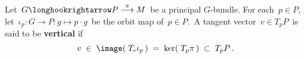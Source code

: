 
\vskip 0.5cm
\begin{definition}
\mbox{}
\vskip 0.2cm
\noindent
Let \,$G \longhookrightarrow P \overset{\pi}{\longrightarrow} M$\, be a principal $G$-bundle.
For each \,$p \in P$,\, let \,$\iota_{p} : G \longrightarrow P : g \longmapsto p \cdot g$\, be the orbit map of \,$p \in P$.\,
A tangent vector \,$v \in T_{p}P$\, is said to be \textbf{vertical} if
\begin{equation*}
v \;\in\; \image\!\left(\;T_{e}\iota_{p}\,\right) \;=\; \ker\!\left(\;T_{p}\pi\,\right) \;\subset\; T_{p}P\,.
\end{equation*}
\end{definition}



